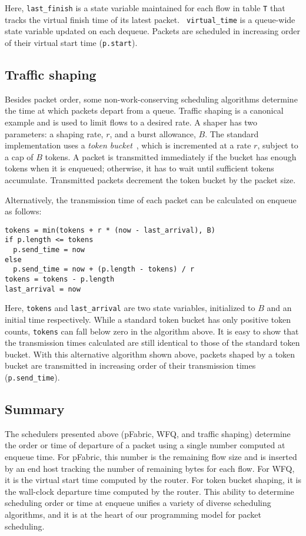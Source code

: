 Here, {\tt last\_finish} is a state variable maintained for each flow in table
{\tt T} that tracks the virtual finish time of its latest packet. {\tt
virtual\_time} is a queue-wide state variable updated on each dequeue.  Packets
are scheduled in increasing order of their virtual start time ({\tt p.start}).

\subsection{Traffic shaping}
Besides packet order, some non-work-conserving scheduling algorithms determine
the time at which packets depart from a queue. Traffic shaping is a canonical
example and is used to limit flows to a desired rate. A shaper has two
parameters: a shaping rate, $r$, and a burst allowance, $B$. The standard
implementation uses a {\em token bucket}~\cite{tbf}, which is incremented at a
rate $r$, subject to a cap of $B$ tokens. A packet is transmitted immediately
if the bucket has enough tokens when it is enqueued; otherwise, it has to wait
until sufficient tokens accumulate. Transmitted packets decrement the token
bucket by the packet size.

Alternatively, the transmission time of each packet can be calculated
on enqueue as follows: 
\begin{lstlisting}[style=customc]
tokens = min(tokens + r * (now - last_arrival), B)
if p.length <= tokens
  p.send_time = now
else
  p.send_time = now + (p.length - tokens) / r
tokens = tokens - p.length
last_arrival = now
\end{lstlisting}

Here, {\tt tokens} and {\tt last\_arrival} are two state variables, initialized
to $B$ and an initial time respectively.  While a standard token bucket has
only positive token counts, {\tt tokens} can fall below zero in the algorithm
above.  It is easy to show that the transmission times calculated are still
identical to those of the standard token bucket. With this alternative
algorithm shown above, packets shaped by a token bucket are transmitted in
increasing order of their transmission times ({\tt p.send\_time}).

\subsection{Summary}
The schedulers presented above (pFabric, WFQ, and traffic shaping) determine
the order or time of departure of a packet using a single number computed at
enqueue time.  For pFabric, this number is the remaining flow size and is
inserted by an end host tracking the number of remaining bytes for each flow.
For WFQ, it is the virtual start time computed by the router.  For token bucket
shaping, it is the wall-clock departure time computed by the router.  This
ability to determine scheduling order or time at enqueue unifies a variety of
diverse scheduling algorithms, and it is at the heart of our programming model
for packet scheduling.

